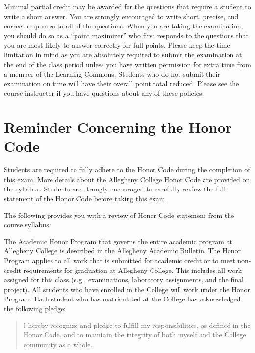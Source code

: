 \vspace*{-.05in}
\noindent Minimal partial credit may be awarded for the questions that require a student to write a short answer. You
are strongly encouraged to write short, precise, and correct responses to all of the questions. When you are taking the
examination, you should do so as a ``point maximizer'' who first responds to the questions that you are most likely to
answer correctly for full points. Please keep the time limitation in mind as you are absolutely required to submit the
examination at the end of the class period unless you have written permission for extra time from a member of the
Learning Commons. Students who do not submit their examination on time will have their overall point total reduced.
Please see the course instructor if you have questions about any of these policies.

\vspace*{-.15in}
\section*{Reminder Concerning the Honor Code}

\noindent Students are required to fully adhere to the Honor Code during the completion of this exam. More details about
the Allegheny College Honor Code are provided on the syllabus. Students are strongly encouraged to carefully review the
full statement of the Honor Code before taking this exam.

\noindent The following provides you with a review of Honor Code statement from the course syllabus:

The Academic Honor Program that governs the entire academic program at Allegheny College is described in the Allegheny
Academic Bulletin.  The Honor Program applies to all work that is submitted for academic credit or to meet non-credit
requirements for graduation at Allegheny College.  This includes all work assigned for this class (e.g., examinations,
laboratory assignments, and the final project).  All students who have enrolled in the College will work under the Honor
Program.  Each student who has matriculated at the College has acknowledged the following pledge:

\vspace*{-.11in}
\begin{quote}
  I hereby recognize and pledge to fulfill my responsibilities, as defined in the Honor Code, and to maintain the
  integrity of both myself and the College community as a whole.
\end{quote}
\vspace*{-.11in}

